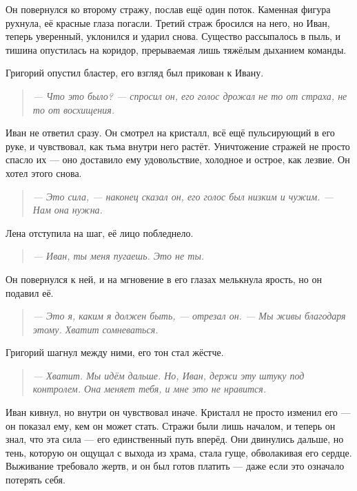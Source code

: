 \documentclass[12pt,a4paper]{book}
\newenvironment{dialogue}{\begin{quote}\itshape}{\end{quote}} %
\begin{document}
Он повернулся ко второму стражу, послав ещё один поток. Каменная фигура рухнула, её красные глаза погасли. Третий страж бросился на него, но Иван, теперь уверенный, уклонился и ударил снова. Существо рассыпалось в пыль, и тишина опустилась на коридор, прерываемая лишь тяжёлым дыханием команды.

Григорий опустил бластер, его взгляд был прикован к Ивану.

\begin{dialogue}
--- Что это было? --- спросил он, его голос дрожал не то от страха, не то от восхищения.
\end{dialogue}

Иван не ответил сразу. Он смотрел на кристалл, всё ещё пульсирующий в его руке, и чувствовал, как тьма внутри него растёт. Уничтожение стражей не просто спасло их --- оно доставило ему удовольствие, холодное и острое, как лезвие. Он хотел этого снова.

\begin{dialogue}
--- Это сила, --- наконец сказал он, его голос был низким и чужим. --- Нам она нужна.
\end{dialogue}

Лена отступила на шаг, её лицо побледнело.

\begin{dialogue}
--- Иван, ты меня пугаешь. Это не ты.
\end{dialogue}

Он повернулся к ней, и на мгновение в его глазах мелькнула ярость, но он подавил её.

\begin{dialogue}
--- Это я, каким я должен быть, --- отрезал он. --- Мы живы благодаря этому. Хватит сомневаться.
\end{dialogue}

Григорий шагнул между ними, его тон стал жёстче.

\begin{dialogue}
--- Хватит. Мы идём дальше. Но, Иван, держи эту штуку под контролем. Она меняет тебя, и мне это не нравится.
\end{dialogue}

Иван кивнул, но внутри он чувствовал иначе. Кристалл не просто изменил его --- он показал ему, кем он может стать. Стражи были лишь началом, и теперь он знал, что эта сила --- его единственный путь вперёд. Они двинулись дальше, но тень, которую он ощущал с выхода из храма, стала гуще, обволакивая его сердце. Выживание требовало жертв, и он был готов платить --- даже если это означало потерять себя.
\end{document}
